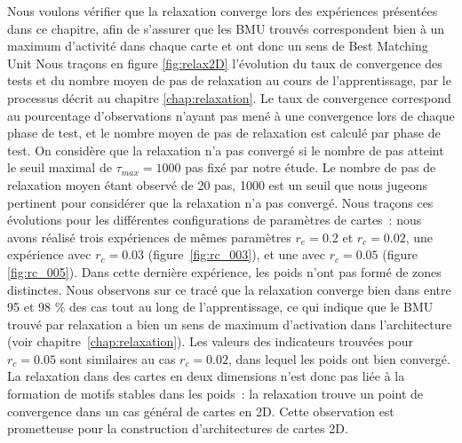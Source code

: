\documentclass[../main]{subfiles}
\begin{document}
Nous voulons vérifier que la relaxation converge lors des expériences présentées dans ce chapitre, afin de s'assurer que les BMU trouvés correspondent bien à un maximum d'activité dans chaque carte et ont donc un sens de \og Best Matching Unit \fg{}
Nous traçons en figure \ref{fig:relax2D} l'évolution du taux de convergence des tests et du nombre moyen de pas de relaxation au cours de l'apprentissage, par le processus décrit au chapitre \ref{chap:relaxation}. Le taux de convergence correspond au pourcentage d'observations n'ayant pas mené à une convergence lors de chaque phase de test, et le nombre moyen de pas de relaxation est calculé par phase de test.
On considère que la relaxation n'a pas convergé si le nombre de pas atteint le seuil maximal de $\tau_{max} = 1000$ pas fixé par notre étude. Le nombre de pas de relaxation moyen étant observé de 20 pas, 1000 est un seuil que nous jugeons pertinent pour considérer que la relaxation n'a pas convergé.
Nous traçons ces évolutions pour les différentes configurations de paramètres de cartes~: nous avons réalisé trois expériences de mêmes paramètres $r_e=0.2$ et $r_c = 0.02$, une expérience avec $r_c = 0.03$ (figure~\ref{fig:rc_003}), et une avec $r_c = 0.05$ (figure \ref{fig:rc_005}).
Dans cette dernière expérience, les poids n'ont pas formé de zones distinctes.
Nous observons sur ce tracé que la relaxation converge bien dans entre 95 et 98 \% des cas tout au long de l'apprentissage, ce qui indique que le BMU trouvé par relaxation a bien un sens de maximum d'activation dans l'architecture (voir chapitre~\ref{chap:relaxation}).
Les valeurs des indicateurs trouvées pour $r_c = 0.05$ sont similaires au cas $r_c = 0.02$, dans lequel les poids ont bien convergé. La relaxation dans des cartes en deux dimensions n'est donc pas liée à la formation de motifs stables dans les poids~: la relaxation trouve un point de convergence dans un cas général de cartes en 2D. Cette observation est prometteuse pour la construction d'architectures de cartes 2D.
\end{document}
